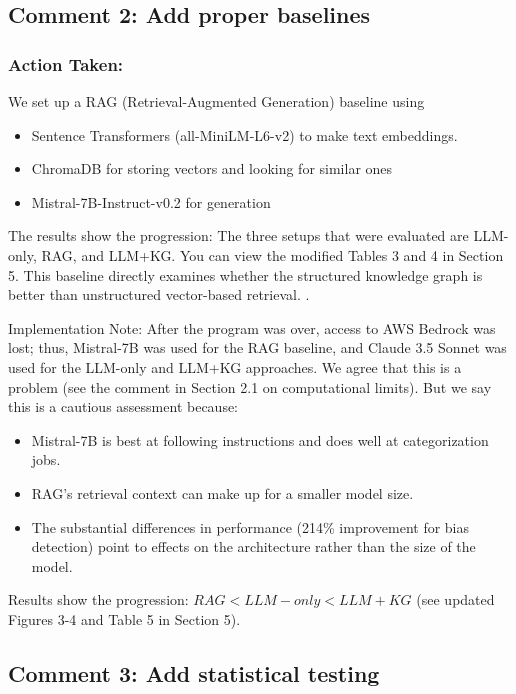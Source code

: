 \documentclass[11pt]{article}
\begin{document}
\subsection{Comment 2: Add proper baselines}

\subsubsection*{Action Taken:}
We set up a RAG (Retrieval-Augmented Generation) baseline using
\begin{itemize}
    \item Sentence Transformers (all-MiniLM-L6-v2) to make text embeddings.
    \item ChromaDB  for storing vectors and looking for similar ones
    \item Mistral-7B-Instruct-v0.2 for  generation

\end{itemize}

The results show the progression: The three setups that were evaluated are LLM-only, RAG, and LLM+KG. You can view the modified Tables 3 and 4 in Section 5. This baseline directly examines whether the structured knowledge graph is better than unstructured vector-based retrieval.
.

Implementation Note: After the program was over, access to AWS Bedrock was lost; thus, Mistral-7B was used for the RAG baseline, and Claude 3.5 Sonnet was used for the LLM-only and LLM+KG approaches. We agree that this is a problem (see the comment in Section 2.1 on computational limits). But we say this is a cautious assessment because:
\begin{itemize}
    \item Mistral-7B is best at following instructions and does well at categorization jobs.
\item  RAG's retrieval context can make up for a smaller model size.
\item The substantial differences in performance (214\% improvement for bias detection) point to effects on the architecture rather than the size of the model.

\end{itemize}

Results show the progression: $RAG < LLM-only < LLM+KG$ (see updated Figures 3-4 and Table 5 in Section 5).

\subsection{Comment 3: Add statistical testing}
\end{document}
